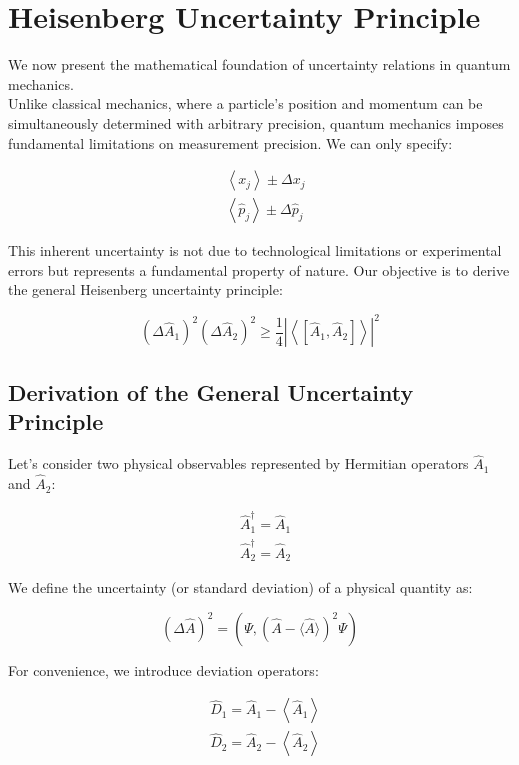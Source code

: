\chapter{Heisenberg Uncertainty Principle}
We now present the mathematical foundation of uncertainty relations in quantum mechanics. \\
Unlike classical mechanics, where a particle's position and momentum can be simultaneously determined with arbitrary precision, quantum mechanics imposes fundamental limitations on measurement precision. We can only specify:

\begin{align}
& \left\langle x_{j}\right\rangle \pm \Delta x_{j} \\
& \left\langle\hat{p}_{j}\right\rangle \pm \Delta \hat{p}_{j}
\end{align}

This inherent uncertainty is not due to technological limitations or experimental errors but represents a fundamental property of nature. Our objective is to derive the general Heisenberg uncertainty principle:

\begin{equation}
\left(\Delta \hat{A}_{1}\right)^{2}\left(\Delta \hat{A}_{2}\right)^{2} \geq \frac{1}{4}\left|\left\langle\left[\hat{A}_{1}, \hat{A}_{2}\right]\right\rangle\right|^{2}
\end{equation}


\section{Derivation of the General Uncertainty Principle}

Let's consider two physical observables represented by Hermitian operators $\hat{A}_1$ and $\hat{A}_2$:

\begin{align}
& \hat{A}_{1}^{\dagger}=\hat{A}_{1} \\
& \hat{A}_{2}^{\dagger}=\hat{A}_{2}
\end{align}

We define the uncertainty (or standard deviation) of a physical quantity as:

\begin{equation}
(\Delta \hat{A})^{2}=\left(\Psi,(\hat{A}-\langle\hat{A}\rangle)^{2} \Psi\right)
\end{equation}

For convenience, we introduce deviation operators:

\begin{align}
& \hat{D}_{1}=\hat{A}_{1}-\left\langle\hat{A}_{1}\right\rangle \\
& \hat{D}_{2}=\hat{A}_{2}-\left\langle\hat{A}_{2}\right\rangle
\end{align}

